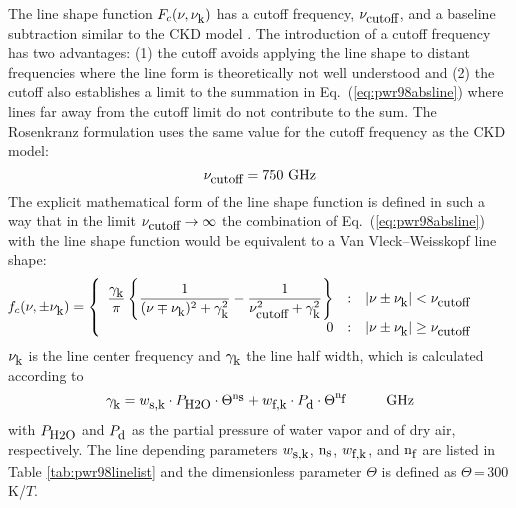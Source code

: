 The line shape function $F_{c}(\nu,\nu_{\mbox{\rm \small k}})$ has a cutoff frequency, $\nu_{\mbox{\rm \small cutoff}}$,
and a baseline subtraction similar to the CKD model \cite{clough:89}.
The introduction of a cutoff frequency has two advantages: (1) the
cutoff avoids applying the line shape to distant frequencies where the 
line form is theoretically not well understood and (2) the cutoff also
establishes a limit to the summation in Eq.~(\ref{eq:pwr98absline}) where lines
far away from the cutoff limit do not contribute to the sum.  
The Rosenkranz formulation uses the same value for
the cutoff frequency as the CKD model:
\begin{equation} 
 \label{cutoff}
 \nu_{\mbox{\rm \small cutoff}} = 750\mbox{ GHz}
\end{equation}
%
The explicit mathematical form of the line shape function is defined 
in such a way that in the limit $\nu_{\mbox{\rm \small cutoff}} \rightarrow \infty$ the 
combination of Eq.~(\ref{eq:pwr98absline}) with the line shape function would 
be equivalent to a Van Vleck--Weisskopf \citep{vanvleck:45} line shape: 
\begin{equation}
 \label{eq:pwr98lineshape}
 \hspace*{-8mm}\shapefpm = 
   \left \{ \begin{array}{r@{\quad:\quad}l} 
   \displaystyle{\frac{\gamk}{\pi}} 
   \left \{ \displaystyle{\frac{1}{(\nu \mp \nuk)^2 + \gamk^2}} - 
   \displaystyle{\frac{1}{\nucut^2 + \gamk^2}} \right \}
   & |\nu \pm \nuk| < \nucut \\ 
   0 & |\nu \pm \nuk| \geq \nucut
                       \end{array} \right.
\end{equation}
$\nu_{\mbox{\rm \small k}}$ is the line center frequency and $\gamma_{\mbox{\rm \small k}}$ the line
half width, which is calculated according to 
\begin{equation}
 \label{eq:pwr98gamma}
 \gamk = \ws \cdot \phzo \cdot \Theta^{\xs} + 
         \wf \cdot \pda  \cdot \Theta^{\xf}\hspace*{10mm}\mbox{GHz}
\end{equation}
with $P_{\mbox{\rm \small H2O}}$ and $P_{\mbox{\rm \small d}}$ as the partial pressure of water vapor and of 
dry air, respectively. The line depending parameters $w_{\mbox{\rm \small s,k}}$, ${\rm n}_{\mbox{\rm \small s}}$, 
$w_{\mbox{\rm \small f,k}}$, and ${\rm n}_{\mbox{\rm \small f}}$ are listed in Table \ref{tab:pwr98linelist} and the 
dimensionless parameter $\Theta$ is defined as $\Theta$\,=\,300\,K/$T$.

